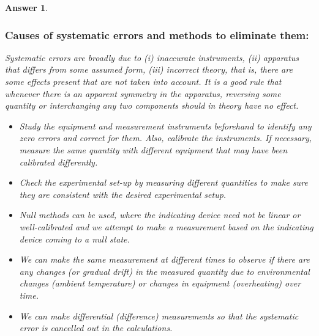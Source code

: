\documentclass[a4paper]{article}
\newtheorem{ans}{Answer}[subsection]
\theoremstyle{new}
\begin{document}
\begin{ans}\leavevmode
\subsubsection*{Causes of systematic errors and methods to eliminate them:}
Systematic errors are broadly due to (i) inaccurate instruments, (ii) apparatus that differs from some assumed form, (iii) incorrect theory, that is, there are some effects present that are not taken into account. It is a good rule that whenever there is an apparent symmetry in the apparatus, reversing some quantity or interchanging any two components should in theory have no effect.
\begin{itemize}
    \item Study the equipment and measurement instruments beforehand to identify any zero errors and correct for them. Also, calibrate the instruments. If necessary, measure the same quantity with different equipment that may have been calibrated differently.
    \item Check the experimental set-up by measuring different quantities to make sure they are consistent with the desired experimental setup.
    \item Null methods can be used, where the indicating device need not be linear or well-calibrated and we attempt to make a measurement based on the indicating device coming to a null state.
    \item We can make the same measurement at different times to observe if there are any changes (or gradual drift) in the measured quantity due to environmental changes (ambient temperature) or changes in equipment (overheating) over time.
    \item We can make differential (difference) measurements so that the systematic error is cancelled out in the calculations.
\end{itemize}

\end{ans}
\end{document}
